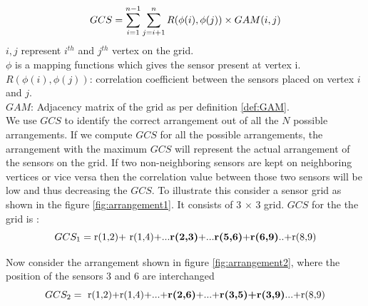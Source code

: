 \begin{equation}
\centering
GCS=\sum_{i=1}^{n-1}\sum_{j=i+1}^{n} R(\phi(i),\phi(j))  \times GAM(i,j)
\label{eq:gridCorrelationSum}
\end{equation}
$i,j$ represent $ i^{th}$ and $ j^{th}$ vertex on the grid.\\
$\phi$ is a mapping functions which gives the sensor present at vertex i.\\
$ R(\phi(i),\phi(j))$: correlation coefficient between the sensors placed on vertex $i$ and $j$.\\
$GAM$:  Adjacency matrix of the grid as per definition \ref{def:GAM}.\\

We use $GCS$ to identify the correct arrangement out of all the $N$ possible arrangements. If we compute  $GCS$ for all the possible arrangements, the arrangement with the maximum $GCS$ will represent the actual arrangement of the sensors on the grid.  
If two non-neighboring sensors are kept on neighboring vertices or vice versa then the correlation value between those two sensors will be low and thus decreasing the $GCS$.
To illustrate this consider a sensor grid as shown in the figure \ref{fig:arrangement1}.
 It consists of 3 $\times$ 3 grid.  
$GCS$ for the  the grid is :\\
\begin{equation*}
GCS_{1}=\text{r(1,2)+ r(1,4)+...\textbf{r(2,3)}+...\textbf{r(5,6)}+\textbf{r(6,9)}..+r(8,9)}
\end{equation*}

Now consider the arrangement shown in figure \ref{fig:arrangement2}, where the position of the sensors 3 and 6 are interchanged\\
\begin{equation*}
GCS_{2}=\text{ r(1,2)+r(1,4)+...+\textbf{r(2,6)}+...+\textbf{r(3,5)+r(3,9)}...+r(8,9)}
\end{equation*}

